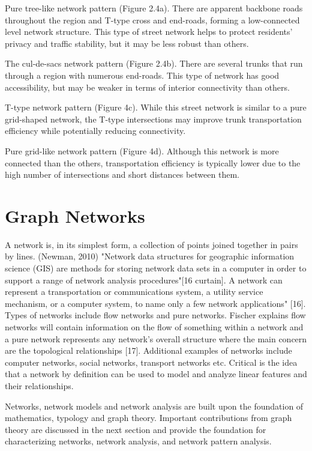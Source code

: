 Pure tree-like network pattern (Figure 2.4a). There are apparent backbone roads throughout the region and T-type cross and end-roads, forming a low-connected level network structure. This type of street network helps to protect residents' privacy and traffic stability, but it may be less robust than others.

The cul-de-sacs network pattern (Figure 2.4b). There are several trunks that run through a region with numerous end-roads. This type of network has good accessibility, but may be weaker in terms of interior connectivity than others.

T-type network pattern (Figure 4c). While this street network is similar to a pure grid-shaped network, the T-type intersections may improve trunk transportation efficiency while potentially reducing connectivity.

Pure grid-like network pattern (Figure 4d). Although this network is more connected than the others, transportation efficiency is typically lower due to the high number of intersections and short distances between them.

\section{Graph Networks}
A network is, in its simplest form, a collection of points joined together in pairs by lines. (Newman, 2010) "Network data structures for geographic information science (GIS) are methods for storing network data sets in a computer in order to support a range of network analysis procedures"[16 curtain]. A network can represent a transportation or communications system, a utility service mechanism, or a computer system, to name only a few network applications" [16]. Types of networks include flow networks and pure networks. Fischer explains flow networks will contain information on the flow of something within a network and a pure network represents any network's overall structure where the main concern are the topological relationships [17]. Additional examples of networks include computer networks, social networks, transport networks etc. Critical is the idea that a network by definition can be used to model and analyze linear features and their relationships. 

Networks, network models and network analysis are built upon the foundation of mathematics, typology and graph theory. Important contributions from graph theory are discussed in the next section and provide the foundation for characterizing networks, network analysis, and network pattern analysis.


